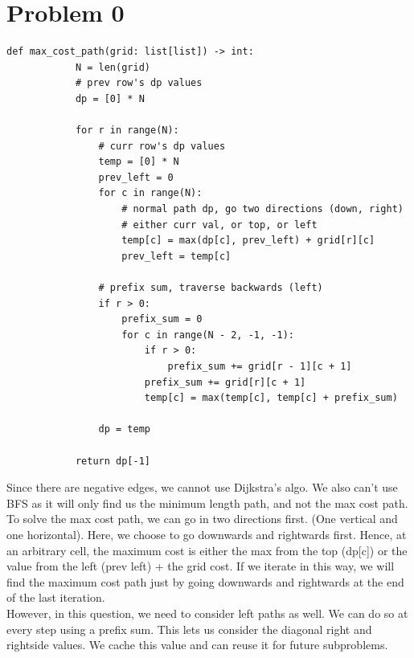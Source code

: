 \documentclass[12pt,letterpaper]{article}
\begin{document}
\section*{Problem 0}

\item

    \begin{lstlisting}[style = Python]
        def max_cost_path(grid: list[list]) -> int:
            N = len(grid)
            # prev row's dp values
            dp = [0] * N
            
            for r in range(N):
                # curr row's dp values
                temp = [0] * N
                prev_left = 0
                for c in range(N):
                    # normal path dp, go two directions (down, right)
                    # either curr val, or top, or left
                    temp[c] = max(dp[c], prev_left) + grid[r][c]
                    prev_left = temp[c]
                
                # prefix sum, traverse backwards (left)
                if r > 0:
                    prefix_sum = 0
                    for c in range(N - 2, -1, -1):
                        if r > 0:
                            prefix_sum += grid[r - 1][c + 1]
                        prefix_sum += grid[r][c + 1]
                        temp[c] = max(temp[c], temp[c] + prefix_sum)
                
                dp = temp
        
            return dp[-1]
\end{lstlisting}

Since there are negative edges, we cannot use Dijkstra's algo.
We also can't use BFS as it will only find us the minimum length path, 
and not the max cost path.
To solve the max cost path, we can go in two directions first. (One vertical and one horizontal).
Here, we choose to go downwards and rightwards first.
Hence, at an arbitrary cell, 
the maximum cost is either the max from the top (dp[c]) or the value from the left (prev left) + the grid cost.
If we iterate in this way, we will find the maximum cost path
just by going downwards and rightwards at the end of the last iteration. \\

However, in this question, we need to consider left paths as well.
We can do so at every step using a prefix sum.
This lets us consider the diagonal right and rightside values.
We cache this value and can reuse it for future subproblems.
\end{document}

